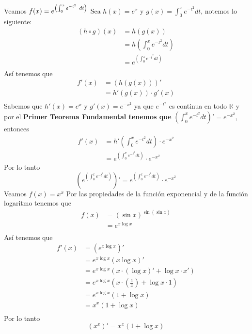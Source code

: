 \documentclass[a4paper]{article}
\begin{document}
Veamos \(f(x) = e^{\left(\int_{0}^{x} e^{-t^2} \ dt\right)} \\\)
\newline
Sea \(h(x) = e^{x}\) y \(g(x) = \int_{0}^{x} e^{-t^2} dt\), notemos lo siguiente:
\begin{align*}
    \left(h \circ g\right)(x) &= h(g(x)) \\
                              &= h\left(\int_{0}^{x} e^{-t^2} dt\right) \\
                              &= e^{\left(\int_{0}^{x} e^{-t^2} dt\right)} \\
\end{align*}
Así tenemos que
\begin{align*}
    f'(x) &= \left(h(g(x))\right)' \\
          &= h'(g(x))\cdot g'(x) \\
\end{align*}
Sabemos que \(h'(x) = e^{x}\) y \(g'(x) = e^{-x^2}\) ya que \(e^{-t^2}\) es continua en todo \(\mathbb{R}\)
y por el \textbf{Primer Teorema Fundamental tenemos que} \(\left(\int_{0}^{x} e^{-t^2} dt\right)' = e^{-x^2}\),
entonces
\begin{align*}
    f'(x) &= h'\left(\int_{0}^{x} e^{-t^2} dt\right)\cdot e^{-x^2} \\
          &= e^{\left(\int_{0}^{x} e^{-t^2} dt\right)}\cdot e^{-x^2}
\end{align*}
Por lo tanto 
\[
    \boxed{\boxed{\left(e^{\left(\int_{0}^{x} e^{-t^2} dt\right)}\right)' = e^{\left(\int_{0}^{x} e^{-t^2} dt\right)}\cdot e^{-x^2}}}  
\]
Veamos \(f(x) = x^{x}\)
Por las propiedades de la función exponencial y de la función logaritmo tenemos que
\begin{align*}
    f(x) &= \left(\sin{x}\right)^{\sin{\left(\sin{x}\right)}} \\
         &= e^{x \log{x}} \\
\end{align*}
Así tenemos que 
\begin{align*}
    f'(x) &= \left(e^{x \log{x}}\right)' \\
          &= e^{x \log{x}}\left(x \log{x}\right)' \\
          &= e^{x \log{x}}\left(x \cdot \left(\log{x}\right)' + \log{x} \cdot x'\right) \\
          &= e^{x \log{x}}\left(x \cdot \left(\frac{1}{x}\right) + \log{x} \cdot 1\right) \\
          &= e^{x \log{x}}\left(1 + \log{x}\right) \\
          &= x^{x}\left(1 + \log{x}\right) \\
\end{align*}
Por lo tanto 
\[
    \boxed{\boxed{\left(x^x\right)' = x^{x}\left(1 + \log{x}\right)}}
\]
\newpage
\end{document}
